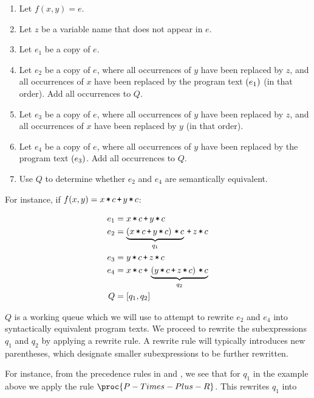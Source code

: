 \begin{enumerate}

\item Let $f(x,y)=e$.

\item Let $z$ be a variable name that does not appear in $e$.

\item Let $e_1$ be a copy of $e$.

\item Let $e_2$ be a copy of $e$, where all occurrences of $y$ have been
replaced by $z$, and all occurrences of $x$ have been replaced by the program
text $\left({e_1}\right)$ (in that order). Add all occurrences to $Q$.

\item Let $e_3$ be a copy of $e$, where all occurrences of $y$ have been
replaced by $z$, and all occurrences of $x$ have been replaced by $y$ (in that
order).

\item Let $e_4$ be a copy of $e$, where all occurrences of $y$ have been
replaced by the program text $\left({e_3}\right)$. Add all occurrences to $Q$.

\item Use $Q$ to determine whether $e_2$ and $e_4$ are semantically equivalent.

\end{enumerate}

For instance, if $f(x,y)=x\lt c \lp y\lt c$:

\begin{align*}
e_1 &= x\lt c \lp y\lt c \\
e_2 &= \underbrace{\p{x\lt c \lp y\lt c} \lt c}_{q_1} \lp z \lt c \\
e_3 &= y\lt c \lp z \lt c \\
e_4 &= x \lt c \lp \underbrace{\p{ y \lt c \lp z \lt c } \lt c}_{q_2} \\
Q &= \seq{q_1, q_2 }
\end{align*}

$Q$ is a working queue which we will use to attempt to rewrite $e_2$ and $e_4$
into syntactically equivalent program texts. We proceed to rewrite the
subexpressions $q_1$ and $q_2$ by applying a rewrite rule. A rewrite rule will
typically introduces new parentheses, which designate smaller subexpressions to
be further rewritten.

For instance, from the precedence rules in  and
, we see that for $q_1$ in the example above
we apply the rule $\proc{P-Times-Plus-R}$. This rewrites $q_1$ into


